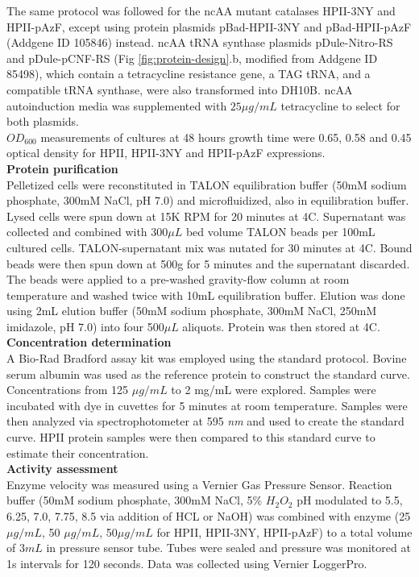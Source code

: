 \documentclass[journal=jacsat,manuscript=article]{achemso}
\begin{document}
The same protocol was followed for the ncAA mutant catalases HPII-3NY and HPII-pAzF, except using protein plasmids pBad-HPII-3NY and pBad-HPII-pAzF (Addgene ID 105846) instead. ncAA tRNA synthase plasmids pDule-Nitro-RS and pDule-pCNF-RS (Fig \ref{fig:protein-design}.b, modified from Addgene ID 85498), which contain a tetracycline resistance gene, a TAG tRNA, and a compatible tRNA synthase, were also transformed into DH10B. ncAA autoinduction media was supplemented with $25\mu g / mL$ tetracycline to select for both plasmids.\\

$OD_{600}$ measurements of cultures at 48 hours growth time were 0.65, 0.58 and 0.45 optical density for HPII, HPII-3NY and HPII-pAzF expressions.\\

\textbf{Protein purification}\\
Pelletized cells were reconstituted in TALON equilibration buffer (50mM sodium phosphate, 300mM NaCl, pH 7.0) and microfluidized, also in equilibration buffer. Lysed cells were spun down at 15K RPM for 20 minutes at 4\degree C. Supernatant was collected and combined with 300$\mu L$ bed volume TALON beads per 100mL cultured cells. TALON-supernatant mix was nutated for 30 minutes at 4\degree C. Bound beads were then spun down at 500g for 5 minutes and the supernatant discarded. The beads were applied to a pre-washed gravity-flow column at room temperature and washed twice with 10mL equilibration buffer. Elution was done using 2mL elution buffer (50mM sodium phosphate, 300mM NaCl, 250mM imidazole, pH 7.0) into four 500$\mu L$ aliquots. Protein was then stored at 4\degree C.\\

\textbf{Concentration determination}\\
A Bio-Rad Bradford assay kit was employed using the standard protocol. Bovine serum albumin was used as the reference protein to construct the standard curve. Concentrations from 125 $\mu g / mL$ to 2 mg/mL were explored. Samples were incubated with dye in cuvettes for 5 minutes at room temperature. Samples were then analyzed via spectrophotometer at 595 \textit{nm} and used to create the standard curve. HPII protein samples were then compared to this standard curve to estimate their concentration.\\

\textbf{Activity assessment}\\
Enzyme velocity was measured using a Vernier Gas Pressure Sensor. Reaction buffer (50mM sodium phosphate, 300mM NaCl, 5\% $H_2O_2$ pH modulated to 5.5, 6.25, 7.0, 7.75, 8.5 via addition of HCL or NaOH) was combined with enzyme (25 $\mu g/mL$, 50 $\mu g/mL$, 50$\mu g/mL$ for HPII, HPII-3NY, HPII-pAzF) to a total volume of $3mL$ in pressure sensor tube. Tubes were sealed and pressure was monitored at 1s intervals for 120 seconds. Data was collected using Vernier LoggerPro.\\
\end{document}
